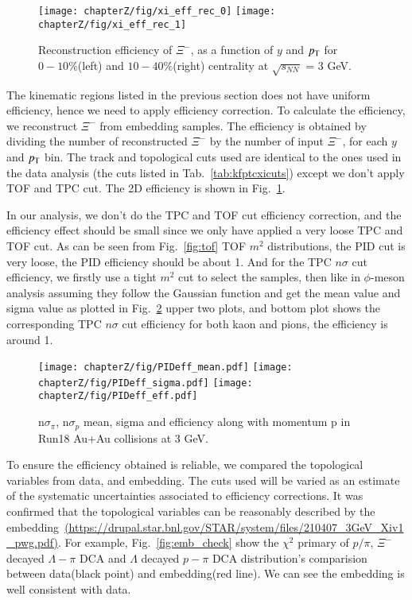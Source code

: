 \begin{figure*}[hbt!]
\texttt{[image: chapterZ/fig/xi\_eff\_rec\_0]}
\texttt{[image: chapterZ/fig/xi\_eff\_rec\_1]}
\caption{Reconstruction efficiency of $\Xi^{-}$, as a function of $y$ and $p_{\rm{T}}$ for $0-10\%$(left) and $10-40\%$(right) centrality at $\sqrt{s_{NN}}$ = 3 GeV.}
\label{xi_eff}
\end{figure*}

The kinematic regions listed in the previous section does not have uniform efficiency, hence we need to apply efficiency correction. To calculate the efficiency, we reconstruct $\Xi^{-}$ from embedding samples. The efficiency is obtained by dividing the number of reconstructed $\Xi^{-}$ by the number of input $\Xi^{-}$, for each $y$ and $p_{\rm T}$ bin. The track and topological cuts used are identical to the ones used in the data analysis (the cuts listed in Tab.~\ref{tab:kfptcxicuts}) except we don't apply TOF and TPC cut. The 2D efficiency is shown in Fig.~\ref{xi_eff}. 

In our analysis, we don't do the TPC and TOF cut efficiency correction, and the efficiency effect should be small since we only have applied a very loose TPC and TOF cut. As can be seen from Fig.~\ref{fig:tof} TOF $m^2$ distributions, the PID cut is very loose, the PID efficiency should be about 1. And for the TPC $n\sigma$ cut efficiency, we firstly use a tight $m^2$ cut to select the samples, then like in $\phi$-meson analysis assuming they follow the Gaussian function and get the mean value and sigma value as plotted in Fig.~\ref{fig:pid_eff} upper two plots, and bottom plot shows the corresponding TPC $n\sigma$ cut efficiency for both kaon and pions, the efficiency is around 1.

\begin{figure*}[hbt!]
\texttt{[image: chapterZ/fig/PIDeff\_mean.pdf]}
\texttt{[image: chapterZ/fig/PIDeff\_sigma.pdf]}
\texttt{[image: chapterZ/fig/PIDeff\_eff.pdf]}
\caption{n$\sigma_{\pi}$, n$\sigma_{p}$ mean, sigma and efficiency along with momentum p in Run18 Au+Au collisions at 3 GeV.}
\label{fig:pid_eff}
\end{figure*}

To ensure the efficiency obtained is reliable, we compared the topological variables from data, and embedding. The cuts used will be varied as an estimate of the systematic uncertainties associated to efficiency corrections. It was confirmed that the topological variables can be reasonably described by the embedding~\url{(https://drupal.star.bnl.gov/STAR/system/files/210407_3GeV_Xiv1_pwg.pdf)}. For example, Fig.~\ref{fig:emb_check} show the $\chi^2$ primary of $p/\pi$, $\Xi^-$ decayed $\Lambda-\pi$ DCA and $\Lambda$ decayed $p-\pi$ DCA distribution's comparision between data(black point) and embedding(red line). We can see the embedding is well consistent with data.

